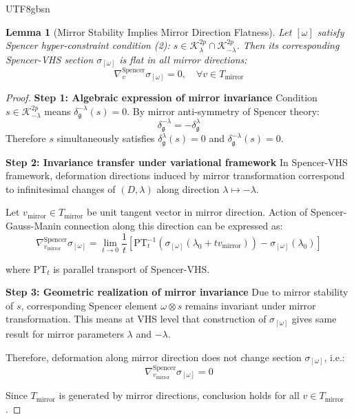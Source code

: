 \documentclass[a4paper,12pt]{extarticle}
\newtheorem{lemma}[theorem]{Lemma}
\theoremstyle{definition}
\begin{document}
\begin{CJK}{UTF8}{gbsn}
\begin{lemma}[Mirror Stability Implies Mirror Direction Flatness]
\label{lem:mirror_flatness}
Let $[\omega]$ satisfy Spencer hyper-constraint condition (2): $s \in \mathcal{K}^{2p}_\lambda \cap \mathcal{K}^{2p}_{-\lambda}$. Then its corresponding Spencer-VHS section $\sigma_{[\omega]}$ is flat in all mirror directions:
$$\nabla^{\text{Spencer}}_{v} \sigma_{[\omega]} = 0, \quad \forall v \in T_{\text{mirror}}$$
\end{lemma}

\begin{proof}
\textbf{Step 1: Algebraic expression of mirror invariance}
Condition $s \in \mathcal{K}^{2p}_{-\lambda}$ means $\delta^{-\lambda}_{\mathfrak{g}}(s) = 0$. By mirror anti-symmetry of Spencer theory:
$$\delta^{-\lambda}_{\mathfrak{g}} = -\delta^{\lambda}_{\mathfrak{g}}$$
Therefore $s$ simultaneously satisfies $\delta^{\lambda}_{\mathfrak{g}}(s) = 0$ and $\delta^{-\lambda}_{\mathfrak{g}}(s) = 0$.

\textbf{Step 2: Invariance transfer under variational framework}
In Spencer-VHS framework, deformation directions induced by mirror transformation correspond to infinitesimal changes of $(D, \lambda)$ along direction $\lambda \mapsto -\lambda$.

Let $v_{\text{mirror}} \in T_{\text{mirror}}$ be unit tangent vector in mirror direction. Action of Spencer-Gauss-Manin connection along this direction can be expressed as:
$$\nabla^{\text{Spencer}}_{v_{\text{mirror}}} \sigma_{[\omega]} = \lim_{t \to 0} \frac{1}{t}[\text{PT}_{t}^{-1}(\sigma_{[\omega]}(\lambda_0 + tv_{\text{mirror}})) - \sigma_{[\omega]}(\lambda_0)]$$

where $\text{PT}_t$ is parallel transport of Spencer-VHS.

\textbf{Step 3: Geometric realization of mirror invariance}
Due to mirror stability of $s$, corresponding Spencer element $\omega \otimes s$ remains invariant under mirror transformation. This means at VHS level that construction of $\sigma_{[\omega]}$ gives same result for mirror parameters $\lambda$ and $-\lambda$.

Therefore, deformation along mirror direction does not change section $\sigma_{[\omega]}$, i.e.:
$$\nabla^{\text{Spencer}}_{v_{\text{mirror}}} \sigma_{[\omega]} = 0$$

Since $T_{\text{mirror}}$ is generated by mirror directions, conclusion holds for all $v \in T_{\text{mirror}}$.
\end{proof}


\end{CJK}
\end{document}
